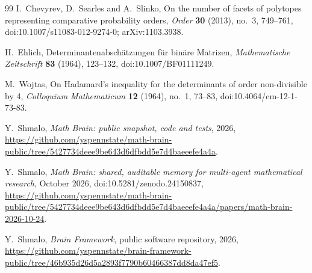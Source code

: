 \documentclass[11pt,a4paper]{article}
\numberwithin{equation}{section}
\theoremstyle{remark}
\begin{document}
\begin{thebibliography}{99}
 I.~Chevyrev, D.~Searles and A.~Slinko, On the number of facets of polytopes representing comparative probability orders, \emph{Order} \textbf{30} (2013), no.~3, 749--761, doi:10.1007/s11083-012-9274-0; arXiv:1103.3938.

 H.~Ehlich, Determinantenabsch\"atzungen f\"ur bin\"are Matrizen, \emph{Mathematische Zeitschrift} \textbf{83} (1964), 123--132, doi:10.1007/BF01111249.

 M.~Wojtas, On Hadamard's inequality for the determinants of order non-divisible by 4, \emph{Colloquium Mathematicum} \textbf{12} (1964), no.~1, 73--83, doi:10.4064/cm-12-1-73-83.

 Y.~Shmalo, \emph{Math Brain: public snapshot, code and tests}, 2026, \url{https://github.com/yspennstate/math-brain-public/tree/5427734deee9be643d6dfbdd5e7d4baeeefe4a4a}.

 Y.~Shmalo, \emph{Math Brain: shared, auditable memory for multi-agent mathematical research}, October 2026, doi:10.5281/zenodo.24150837, \url{https://github.com/yspennstate/math-brain-public/tree/5427734deee9be643d6dfbdd5e7d4baeeefe4a4a/papers/math-brain-2026-10-24}.

 Y.~Shmalo, \emph{Brain Framework}, public software repository, 2026, \url{https://github.com/yspennstate/brain-framework-public/tree/46b935d26d5a2893f7790b60466387dd8da47ef5}.

\end{thebibliography}
\end{document}
